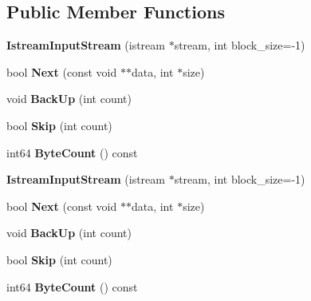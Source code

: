 \subsection*{Public Member Functions}
\begin{DoxyCompactItemize}
\item 
\mbox{\label{classgoogle_1_1protobuf_1_1io_1_1IstreamInputStream_a11dcbae543cb17db2bc71b8b0f7f2c6e}} 
{\bfseries Istream\+Input\+Stream} (istream $\ast$stream, int block\+\_\+size=-\/1)
\item 
\mbox{\label{classgoogle_1_1protobuf_1_1io_1_1IstreamInputStream_aa13fea2151842d44438ff5926cd152a6}} 
bool {\bfseries Next} (const void $\ast$$\ast$data, int $\ast$size)
\item 
\mbox{\label{classgoogle_1_1protobuf_1_1io_1_1IstreamInputStream_a2557bec60f9fc293318a0986d3ba9932}} 
void {\bfseries Back\+Up} (int count)
\item 
\mbox{\label{classgoogle_1_1protobuf_1_1io_1_1IstreamInputStream_a38f43d88ec39042869e304e652172b29}} 
bool {\bfseries Skip} (int count)
\item 
\mbox{\label{classgoogle_1_1protobuf_1_1io_1_1IstreamInputStream_a9b292ed9ab909f5468c4098c63142a07}} 
int64 {\bfseries Byte\+Count} () const
\item 
\mbox{\label{classgoogle_1_1protobuf_1_1io_1_1IstreamInputStream_a11dcbae543cb17db2bc71b8b0f7f2c6e}} 
{\bfseries Istream\+Input\+Stream} (istream $\ast$stream, int block\+\_\+size=-\/1)
\item 
\mbox{\label{classgoogle_1_1protobuf_1_1io_1_1IstreamInputStream_aa13fea2151842d44438ff5926cd152a6}} 
bool {\bfseries Next} (const void $\ast$$\ast$data, int $\ast$size)
\item 
\mbox{\label{classgoogle_1_1protobuf_1_1io_1_1IstreamInputStream_a2557bec60f9fc293318a0986d3ba9932}} 
void {\bfseries Back\+Up} (int count)
\item 
\mbox{\label{classgoogle_1_1protobuf_1_1io_1_1IstreamInputStream_a38f43d88ec39042869e304e652172b29}} 
bool {\bfseries Skip} (int count)
\item 
\mbox{\label{classgoogle_1_1protobuf_1_1io_1_1IstreamInputStream_a9b292ed9ab909f5468c4098c63142a07}} 
int64 {\bfseries Byte\+Count} () const
\end{DoxyCompactItemize}


